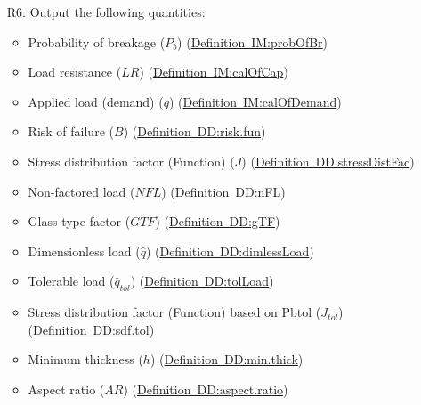 \documentclass[12pt]{article}
\begin{document}
\begin{itemize}
\item[R6:\phantomsection\label{List:output.quantities}]Output the following quantities:
                                                       \begin{itemize}
                                                       \item{Probability of breakage (${P_{b}}$) (\hyperref[IM:probOfBr]{Definition~IM:probOfBr})}
                                                       \item{Load resistance ($LR$) (\hyperref[IM:calOfCap]{Definition~IM:calOfCap})}
                                                       \item{Applied load (demand) ($q$) (\hyperref[IM:calOfDemand]{Definition~IM:calOfDemand})}
                                                       \item{Risk of failure ($B$) (\hyperref[DD:risk.fun]{Definition~DD:risk.fun})}
                                                       \item{Stress distribution factor (Function) ($J$) (\hyperref[DD:stressDistFac]{Definition~DD:stressDistFac})}
                                                       \item{Non-factored load ($NFL$) (\hyperref[DD:nFL]{Definition~DD:nFL})}
                                                       \item{Glass type factor ($GTF$) (\hyperref[DD:gTF]{Definition~DD:gTF})}
                                                       \item{Dimensionless load ($\hat{q}$) (\hyperref[DD:dimlessLoad]{Definition~DD:dimlessLoad})}
                                                       \item{Tolerable load (${\hat{q}_{tol}}$) (\hyperref[DD:tolLoad]{Definition~DD:tolLoad})}
                                                       \item{Stress distribution factor (Function) based on Pbtol (${J_{tol}}$) (\hyperref[DD:sdf.tol]{Definition~DD:sdf.tol})}
                                                       \item{Minimum thickness ($h$) (\hyperref[DD:min.thick]{Definition~DD:min.thick})}
                                                       \item{Aspect ratio ($AR$) (\hyperref[DD:aspect.ratio]{Definition~DD:aspect.ratio})}
                                                       \end{itemize}
\end{itemize}
\end{document}
